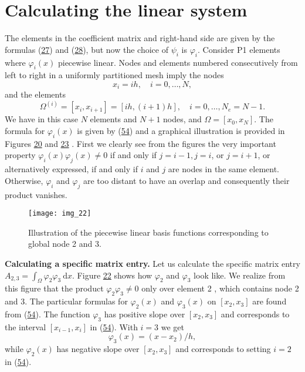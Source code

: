 \documentclass[../main.tex]{subfiles}
\begin{document}
\section[Calculating the linear system]{Calculating the linear system}
\label{sec:sec_3_6}
The elements in the coefficient matrix and right-hand side are given by the formulas (\hyperref[eqa27]{27}) and (\hyperref[eqa28]{28}), but now the choice of $\psi_{i}$ is $\varphi_{i}$. Consider P1 elements where $\varphi_{i}(x)$ piecewise linear. Nodes and elements numbered consecutively from left to right in a uniformly partitioned mesh imply the nodes
$$
x_{i}=i h, \quad i=0, \ldots, N,
$$
and the elements
\begin{equation}\label{eqa55}
	\Omega^{(i)}=\left[x_{i}, x_{i+1}\right]=[i h,(i+1) h], \quad i=0, \ldots, N_{e}=N-1.
\end{equation}
We have in this case $N$ elements and $N+1$ nodes, and $\Omega=\left[x_{0}, x_{N}\right]$. The formula for $\varphi_{i}(x)$ is given by (\hyperref[eqa54]{54}) and a graphical illustration is provided in Figures \hyperref[fig:img_20]{20} and \hyperref[fig:img_23]{23} . First we clearly see from the figures the very important property $\varphi_{i}(x) \varphi_{j}(x) \neq 0$ if and only if $j=i-1, j=i$, or $j=i+1$, or alternatively expressed, if and only if $i$ and $j$ are nodes in the same element. Otherwise, $\varphi_{i}$ and $\varphi_{j}$ are too distant to have an overlap and consequently their product vanishes.
\begin{figure}[H]
	\centering
	\texttt{[image: img\_22]}
	\caption{Illustration of the piecewise linear basis functions corresponding to
		global node 2 and 3.}
	\label{fig:img_22}
\end{figure}

\noindent \textbf{Calculating a specific matrix entry.} Let us calculate the specific matrix entry $A_{2,3}=\int_{\Omega} \varphi_{2} \varphi_{3} \mathrm{~d} x$. Figure \hyperref[fig:img_22]{22} shows how $\varphi_{2}$ and $\varphi_{3}$ look like. We realize from this figure that the product $\varphi_{2} \varphi_{3} \neq 0$ only over element 2 , which contains node 2 and 3. The particular formulas for $\varphi_{2}(x)$ and $\varphi_{3}(x)$ on $\left[x_{2}, x_{3}\right]$ are found from (\hyperref[eqa54]{54}). The function $\varphi_{3}$ has positive slope over $\left[x_{2}, x_{3}\right]$ and corresponds to the interval $\left[x_{i-1}, x_{i}\right]$ in (\hyperref[eqa54]{54}). With $i=3$ we get
$$
\varphi_{3}(x)=\left(x-x_{2}\right) / h,
$$
while $\varphi_{2}(x)$ has negative slope over $\left[x_{2}, x_{3}\right]$ and corresponds to setting $i=2$ in (\hyperref[eqa54]{54}).
\end{document}
